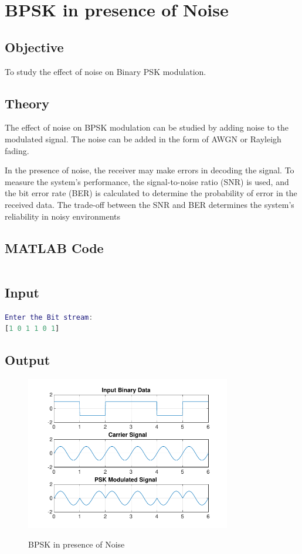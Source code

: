 \pagebreak

\section{BPSK in presence of Noise}
\label{sec:bpsk noise}

\subsection{Objective}
To study the effect of noise on Binary PSK modulation.

\subsection{Theory}
The effect of noise on BPSK modulation can be studied by
adding noise to the modulated signal. The noise can be added
in the form of AWGN or Rayleigh fading.

In the presence of noise, the receiver may make errors in
decoding the signal. To measure the system's performance,
the signal-to-noise ratio (SNR) is used,
and the bit error rate (BER) is calculated to determine
the probability of error in the received data.
The trade-off between the SNR and BER determines the
system's reliability in noisy environments

\subsection{MATLAB Code}

\inputminted[fontsize=\footnotesize,autogobble]{matlab}{code/bpsk_noise.m}

\subsection{Input}

\begin{lstlisting}[language=matlab,backgroundcolor=\color{gray!10}]
Enter the Bit stream: 
[1 0 1 1 0 1]
\end{lstlisting}

\subsection{Output}

\begin{figure}[!htb]
    \centering
    \includegraphics[width=0.8\textwidth]{res/figures/BPSK_noise.pdf}
    \label{output:bpsk noise}
    \caption{BPSK in presence of Noise}
\end{figure}